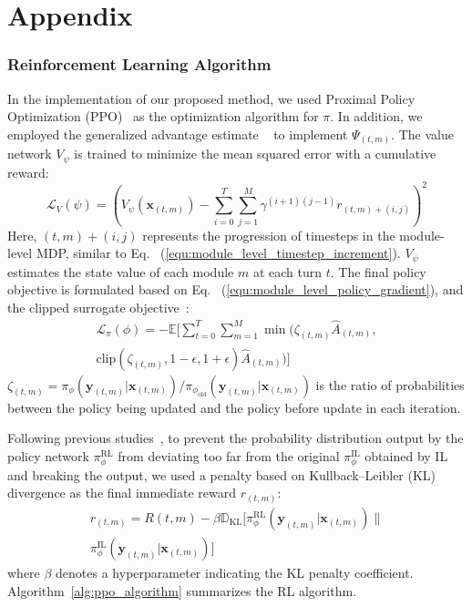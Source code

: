 \appendix

\part*{\centering Appendix}

\section{Reinforcement Learning Algorithm}
\label{appendix:sec:rl_algorithm}

In the implementation of our proposed method, we used Proximal Policy Optimization (PPO)~\citep{schulman2017proximal} as the optimization algorithm for $\pi$. In addition, we employed the generalized advantage estimate ~\citep{schulman2015high} to implement $\Psi_{(t,m)}$. The value network $V_\psi$ is trained to minimize the mean squared error with a cumulative reward:
\begin{equation}
\label{equ:value_loss}
\mathcal{L}_V(\psi) = \left( V_\psi(\bm{x}_{(t,m)}) - \sum_{i=0}^T\sum_{j=1}^M \gamma^{(i+1)(j-1)}r_{(t,m)+(i,j)} \right)^2
\end{equation}
Here, $(t,m)+(i,j)$ represents the progression of timesteps in the module-level MDP, similar to Eq. ~(\ref{equ:module_level_timestep_increment}). $V_\psi$ estimates the state value of each module $m$ at each turn $t$. The final policy objective is formulated based on Eq. ~(\ref{equ:module_level_policy_gradient}), and the clipped surrogate objective~\citep{schulman2017proximal}:
\begin{multline}
\label{equ:policy_loss}
\mathcal{L}_\pi(\phi) = -\mathbb{E} \Bigg[\sum_{t=0}^{T} \sum_{m=1}^M \min \bigg( \zeta_{(t,m)}\hat{A}_{(t,m)} ,\\
\text{clip}(\zeta_{(t,m)},1-\epsilon, 1+\epsilon) \hat{A}_{(t,m)} \bigg) \Bigg]
\end{multline}
$\zeta_{(t,m)} = \pi_\phi(\bm{y}_{(t,m)} | \bm{x}_{(t,m)}) / \pi_{\phi_\text{old}}(\bm{y}_{(t,m)} | \bm{x}_{(t,m)})$ is the ratio of probabilities between the policy being updated and the policy before update in each iteration.

Following previous studies~\citep{ziegler2019fine, NEURIPS2020_1f89885d}, to prevent the probability distribution output by the policy network $\pi_\phi^\text{RL}$ from deviating too far from the original $\pi_\phi^\text{IL}$ obtained by IL and breaking the output, we used a penalty based on Kullback–Leibler (KL) divergence as the final immediate reward $r_{(t,m)}$:
\begin{multline}
\label{equ:immediate_reward}
r_{(t,m)} = R(t,m) - \beta\mathbb{D}_\text{KL}\big[\pi_\phi^\text{RL}(\bm{y}_{(t,m)}|\bm{x}_{(t,m)}) \| \\
\pi_\phi^\text{IL}(\bm{y}_{(t,m)}|\bm{x}_{(t,m)})\big]
\end{multline}
where $\beta$ denotes a hyperparameter indicating the KL penalty coefficient. Algorithm~\ref{alg:ppo_algorithm} summarizes the RL algorithm.

